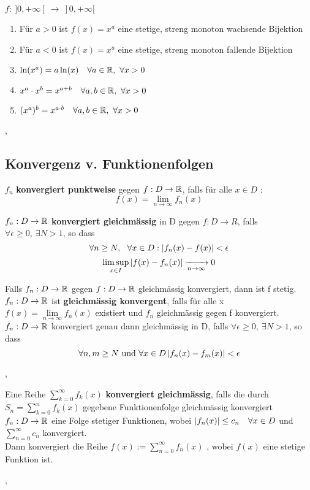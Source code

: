 \Korollar[3.6.6] $f : \ ]0, + \infty[ \ \rightarrow \  ]0, + \infty[$
\begin{enumerate}
\item Für $a > 0$ ist $f(x) = x^a$ eine stetige, streng monoton wachsende Bijektion
\item Für $a < 0$ ist $f(x) = x^a$ eine stetige, streng monoton fallende Bijektion
\item $\ln(x^a) = a \ln(x) \quad \forall a \in \mathbb{R}, \ \forall x > 0$
\item $x^a \cdot x^b = x^{a + b} \quad \forall a, b \in \mathbb{R}, \ \forall x > 0$
\item $(x^a)^b = x^{a \cdot b} \quad \forall a, b \in \mathbb{R}, \ \forall x > 0$
\end{enumerate}

\sep

\subsection{Konvergenz v. Funktionenfolgen}

\Def[3.7.1] $f_n$ \textbf{konvergiert punktweise} gegen ${f : D \rightarrow \mathbb{R}}$, falls für alle $x \in D$ :
\[f(x) =  \lim\limits_{n \rightarrow \infty} f_n(x) \]
 
\Def[3.7.3] $f_n : D \rightarrow \mathbb{R}$ \textbf{konvergiert gleichmässig} in D gegen $f : D \rightarrow R$, falls $ \forall \epsilon \geq 0, \ \exists N > 1$, so dass
\[\forall n \geq N, \ \ \forall x \in D : \left\lvert f_n(x) - f(x) \right\rvert < \epsilon \]
\[\limsup \limits_{x \in I} \left\lvert f(x) - f_n(x)  \right\rvert \xrightarrow[n \rightarrow \infty]{} 0 \]

\Satz[3.7.4] Falls $f_n : D \rightarrow \mathbb{R}$ gegen $f : D \rightarrow \mathbb{R}$ gleichmässig konvergiert, dann ist f stetig. \\

\Satz[3.7.5] $f_n : D \rightarrow \mathbb{R}$ ist \textbf{gleichmässig konvergent}, falls für alle x $f(x) = \lim\limits_{n \rightarrow \infty} f_n(x)$ existiert
und $f_n$ gleichmässig gegen f konvergiert. \\

\Korollar[3.7.6] $f_n : D \rightarrow \mathbb{R}$ konvergiert genau dann gleichmässig in D, falls $ \forall \epsilon \geq 0, \ \exists N > 1$, so dass
\[\forall n, m \geq N \text{ und } \forall x \in D \left\lvert f_n(x) - f_m(x) \right\rvert < \epsilon \]

\sep 

\Def[3.7.8] Eine Reihe $\sum_{k=0}^{\infty} f_k (x)$ \textbf{konvergiert gleichmässig}, falls die durch ${S_n = \sum_{k=0}^{n} f_k (x)}$ gegebene Funktionenfolge gleichmässig konvergiert \\

\Def[3.7.9] $f_n :  D \rightarrow \mathbb{R}$ eine Folge stetiger Funktionen, wobei $\left\lvert f_n (x) \right\rvert \leq c_n \quad \forall x \in D$ und $\sum_{n=0}^\infty c_n$ konvergiert. \\ Dann konvergiert die Reihe $f(x) := \sum_{n=0}^\infty f_n(x)$ , wobei $f(x)$ eine stetige Funktion ist. 

\sep